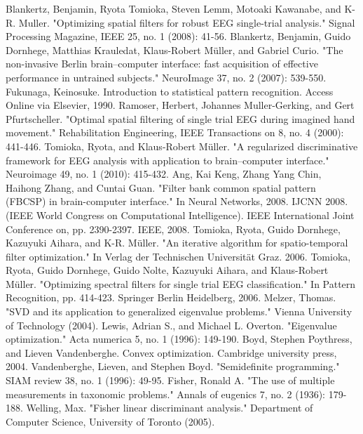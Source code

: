\begin{thebibliography}{99}
 Blankertz, Benjamin, Ryota Tomioka, Steven Lemm, Motoaki Kawanabe, and K-R. Muller. "Optimizing spatial filters for robust EEG single-trial analysis." Signal Processing Magazine, IEEE 25, no. 1 (2008): 41-56.
  Blankertz, Benjamin, Guido Dornhege, Matthias Krauledat, Klaus-Robert Müller, and Gabriel Curio. "The non-invasive Berlin brain–computer interface: fast acquisition of effective performance in untrained subjects." NeuroImage 37, no. 2 (2007): 539-550.
Fukunaga, Keinosuke. Introduction to statistical pattern recognition. Access Online via Elsevier, 1990.
Ramoser, Herbert, Johannes Muller-Gerking, and Gert Pfurtscheller. "Optimal spatial filtering of single trial EEG during imagined hand movement." Rehabilitation Engineering, IEEE Transactions on 8, no. 4 (2000): 441-446.	
 Tomioka, Ryota, and Klaus-Robert Müller. "A regularized discriminative framework for EEG analysis with 
application to brain–computer interface." Neuroimage 49, no. 1 (2010): 415-432.
  Ang, Kai Keng, Zhang Yang Chin, Haihong Zhang, and Cuntai Guan. "Filter bank common spatial pattern (FBCSP) in brain-computer interface." In Neural Networks, 2008. IJCNN 2008.(IEEE World Congress on Computational Intelligence). IEEE International Joint Conference on, pp. 2390-2397. IEEE, 2008.
Tomioka, Ryota, Guido Dornhege, Kazuyuki Aihara, and K-R. Müller. "An iterative algorithm for spatio-temporal filter optimization." In Verlag der Technischen Universität Graz. 2006. 
 Tomioka, Ryota, Guido Dornhege, Guido Nolte, Kazuyuki Aihara, and Klaus-Robert Müller. "Optimizing spectral filters for single trial EEG classification." In Pattern Recognition, pp. 414-423. Springer Berlin Heidelberg, 2006.
Melzer, Thomas. "SVD and its application to generalized eigenvalue problems." Vienna University of Technology (2004).
Lewis, Adrian S., and Michael L. Overton. "Eigenvalue optimization." Acta numerica 5, no. 1 (1996): 149-190.
 Boyd, Stephen Poythress, and Lieven Vandenberghe. Convex optimization. Cambridge university press, 2004.
  Vandenberghe, Lieven, and Stephen Boyd. "Semidefinite programming." SIAM review 38, no. 1 (1996): 
49-95.
 Fisher, Ronald A. "The use of multiple measurements in taxonomic problems." Annals of eugenics 7, no. 
2 (1936): 179-188.
 Welling, Max. "Fisher linear discriminant analysis." Department of Computer Science, University of Toronto (2005).


\end{thebibliography}
